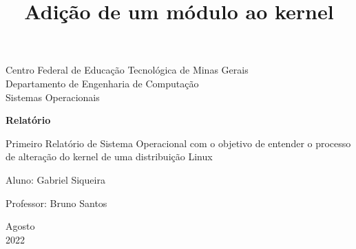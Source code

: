 \documentclass[a4paper, 12pt]{article}
\begin{document}
\begin{titlepage}
	\begin{center}
	

		\large{Centro Federal de Educação Tecnológica de Minas Gerais}\\
		\large{Departamento de Engenharia de Computação}\\ 
		\large{Sistemas Operacionais}\\ 
\vspace{15pt}
        
        \vspace{85pt}
        
		\textbf{\LARGE{Relatório}}
		\title{\large{Adição de um módulo ao kernel}}
			
	\end{center}
\vspace{1,5cm}
	
	\begin{flushright}

   \begin{list}{}{
      \setlength{\leftmargin}{4.5cm}
      \setlength{\rightmargin}{0cm}
      \setlength{\labelwidth}{0pt}
      \setlength{\labelsep}{\leftmargin}}

      \item Primeiro Relatório de Sistema Operacional com o objetivo de entender o processo de alteração do kernel de uma distribuição Linux

      \begin{list}{}{
      \setlength{\leftmargin}{0cm}
      \setlength{\rightmargin}{0cm}
      \setlength{\labelwidth}{0pt}
      \setlength{\labelsep}{\leftmargin}}

			\item Aluno: Gabriel Siqueira \
            \item Professor: Bruno Santos \

      \end{list}
   \end{list}
\end{flushright}
\vspace{1cm}
\begin{center}
		\vspace{\fill}
		 Agosto\\
		 2022
			\end{center}
\end{titlepage}
\newpage
\newpage
\tableofcontents
\thispagestyle{empty}
\end{document}
